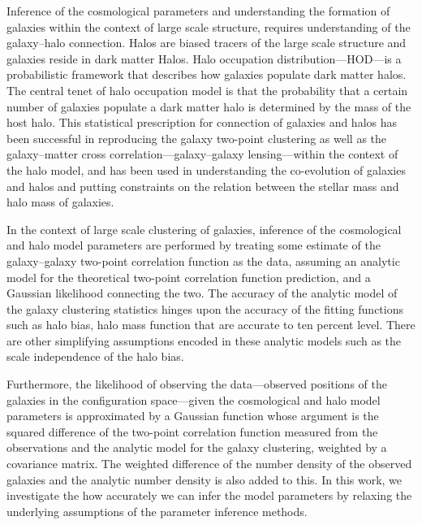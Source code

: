 

Inference of the cosmological parameters and understanding the formation of galaxies within the context of large scale 
structure, requires understanding of the galaxy--halo connection. Halos are biased tracers of the large scale structure 
and galaxies reside in dark matter Halos. Halo occupation distribution---HOD---is a probabilistic framework that describes how galaxies populate dark matter halos. The central tenet of halo occupation model is that the probability that a certain number of galaxies populate a dark matter halo is determined by the mass of the host halo. This statistical prescription for connection of galaxies and halos has been successful in reproducing the galaxy two-point clustering as well as the galaxy--matter cross correlation---galaxy--galaxy 
lensing---within the context of the halo model, and has been used in understanding the co-evolution of galaxies and halos and putting constraints on the relation between the stellar mass and halo mass of galaxies.

In the context of large scale clustering of galaxies, inference of the cosmological and halo model parameters are performed by treating some estimate of the galaxy--galaxy two-point correlation function as the data,
assuming an analytic model for the theoretical two-point correlation function prediction,
and a Gaussian likelihood connecting the two.
The accuracy of the analytic model of the galaxy clustering statistics hinges upon the accuracy of the fitting functions such as halo bias, halo mass function that are accurate to ten percent level. There are other simplifying assumptions encoded in these analytic models such as the scale independence of the halo bias. 

Furthermore, the likelihood of observing the data---observed positions of the galaxies in the configuration space---given the cosmological and halo model parameters is approximated by a Gaussian function whose argument is the squared difference of the two-point correlation function measured from the observations and the analytic model for the galaxy clustering, weighted by a covariance matrix.
The weighted difference of the number density of the observed galaxies and the analytic number density is also added to this. In this work, we investigate the how accurately we can infer the model parameters by relaxing the underlying assumptions of the parameter inference methods. 

